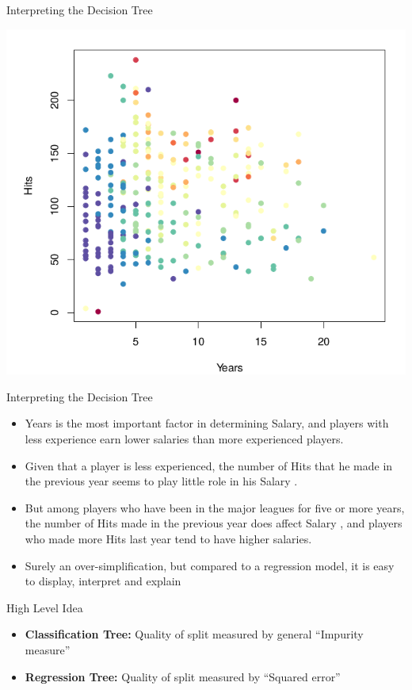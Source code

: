 \documentclass{beamer}
\begin{document}
\begin{frame}{Interpreting the Decision Tree}
    \begin{center}
        \includegraphics[scale=0.3]{baseballSal1.png}
    \end{center}
\end{frame}
\begin{frame}{Interpreting the Decision Tree}
    \begin{itemize}
        \item Years is the most important factor in determining Salary, and players with less experience earn lower salaries than more experienced players.
        \item Given that a player is less experienced, the number of Hits that he made in the previous year seems to play little role in his Salary .
        \item But among players who have been in the major leagues for five or more years, the number of Hits made in the previous year does affect Salary , and players who made more Hits last year tend to have higher salaries.
        \item Surely an over-simplification, but compared to a regression model, it is easy to display, interpret and explain
    \end{itemize}
\end{frame}

\begin{frame}{High Level Idea}
    \begin{itemize}
        \item {\bf Classification Tree:} Quality of split measured by general ``Impurity measure''
        \item {\bf Regression Tree:} Quality of split measured by ``Squared error''
    \end{itemize}
\end{frame}
\end{document}
